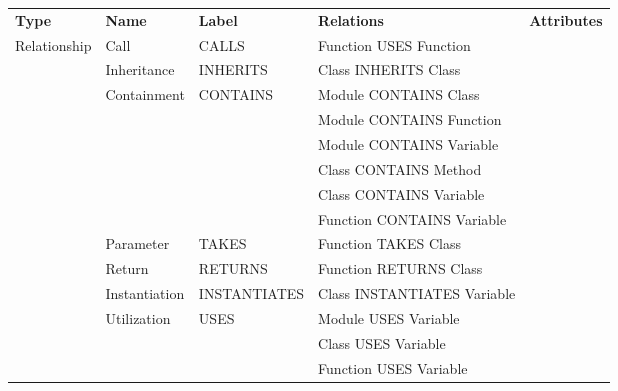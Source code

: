 \begin{tabular}{p{1.6cm}p{1.7cm}p{2cm}p{4.3cm}p{6.5cm}}
\toprule
\textbf{Type} & \textbf{Name} & \textbf{Label} & \textbf{Relations} & \textbf{Attributes} \\
\cmidrule{1-1}\cmidrule{2-2}\cmidrule{3-3}\cmidrule{4-4}\cmidrule{5-5}
\multirow{14}{*}{Relationship} & Call & CALLS & Function USES Function &  \\
\cmidrule{2-2}\cmidrule{3-3}\cmidrule{4-4}\cmidrule{5-5}
 & Inheritance & INHERITS & Class INHERITS Class &  \\
\cmidrule{2-2}\cmidrule{3-3}\cmidrule{4-4}\cmidrule{5-5}
 & \multirow{6}{*}{Containment} & \multirow{6}{*}{CONTAINS} & Module CONTAINS Class &  \\
\cmidrule{4-4}\cmidrule{5-5}
 &  &  & Module CONTAINS Function &  \\
\cmidrule{4-4}\cmidrule{5-5}
 &  &  & Module CONTAINS Variable &  \\
\cmidrule{4-4}\cmidrule{5-5}
 &  &  & Class CONTAINS Method &  \\
\cmidrule{4-4}\cmidrule{5-5}
 &  &  & Class CONTAINS Variable &  \\
\cmidrule{4-4}\cmidrule{5-5}
 &  &  & Function CONTAINS Variable &  \\
\cmidrule{2-2}\cmidrule{3-3}\cmidrule{4-4}\cmidrule{5-5}
 & Parameter & TAKES & Function TAKES Class &  \\
\cmidrule{2-2}\cmidrule{3-3}\cmidrule{4-4}\cmidrule{5-5}
 & Return & RETURNS & Function RETURNS Class &  \\
\cmidrule{2-2}\cmidrule{3-3}\cmidrule{4-4}\cmidrule{5-5}
 & Instantiation & INSTANTIATES & Class INSTANTIATES Variable &  \\
\cmidrule{2-2}\cmidrule{3-3}\cmidrule{4-4}\cmidrule{5-5}
 & \multirow{3}{*}{Utilization} & \multirow{3}{*}{USES} & Module USES Variable &  \\
\cmidrule{4-4}\cmidrule{5-5}
 &  &  & Class USES Variable &  \\
\cmidrule{4-4}\cmidrule{5-5}
 &  &  & Function USES Variable &  \\
\bottomrule
\end{tabular}

